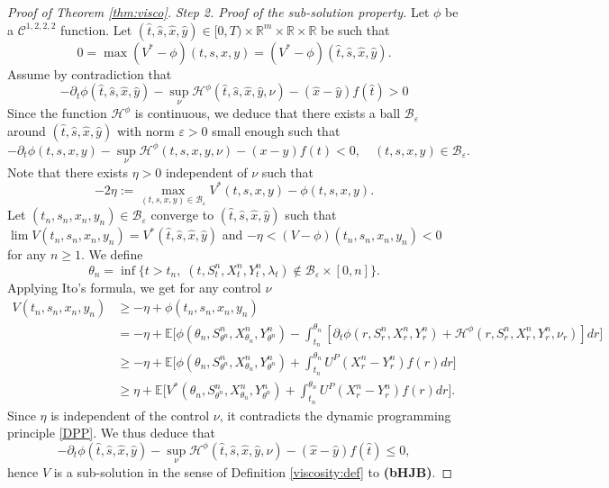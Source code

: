 \documentclass[11pt,a4paper]{article}
\theoremstyle{thmstyleone}%
\theoremstyle{thmstyletwo}%
\theoremstyle{thmstylethree}%
\begin{document}
\begin{proof}[Proof of Theorem \ref{thm:visco}]
        \textit{Step 2. Proof of the sub-solution property.} Let $\phi$ be a $\mathcal C^{1,2,2,2}$ function. Let $(\hat t,\hat s,\hat x,\hat y)\in [0,T)\times \mathbb R^m\times \mathbb R\times \mathbb R$ be such that 
    \[0=\max (V^*-\phi)(t,s,x,y)=(V^*-\phi)(\hat t,\hat s,\hat x,\hat y).\] Assume by contradiction that 
    \begin{equation*}\label{contradiction} -\partial_t \phi(\hat t,\hat s,\hat x,\hat y)-\sup_\nu \mathcal H^\phi(\hat t,\hat s,\hat x,\hat y,\nu)-(\hat x - \hat y) f(\hat t)>0\end{equation*}
    Since the function $\mathcal H^\phi$ is continuous, we deduce that there exists a ball $\mathcal B_\varepsilon$ around $(\hat t,\hat s,\hat x,\hat y)$ with norm $\varepsilon>0$ small enough such that 
    \[ -\partial_t \phi(t,s,x,y)- \sup_\nu \mathcal H^\phi(t,s,x,y,\nu)-(x-y) f(t)<0,\quad (t,s,x,y)\in \mathcal B_\varepsilon.\]
    Note that there exists $\eta>0$ independent of $\nu$ such that \[-2\eta:=\max_{(t,s,x,y)\in \mathcal B_\varepsilon}V^*(t,s,x,y)-\phi(t,s,x,y).\]
    Let $(t_n,s_n,x_n,y_n)\in \mathcal B_\varepsilon$ converge to $(\hat t,\hat s,\hat x,\hat y)$ such that $\lim\limits V(t_n,s_n,x_n,y_n)=V^*(\hat t,\hat s,\hat x,\hat y)$ and $-\eta<(V-\phi)(t_n,s_n,x_n,y_n)<0$ for any $n\geq 1$. We define 
    \[\theta_n=\inf\{t>t_n,\; (t,S^n_t,X^n_t,Y^n_t,\lambda_t)\notin \mathcal B_\varepsilon\times [0,n]\}.\]
Applying Ito's formula, we get for any control $\nu$
\begin{align*}
    V(t_n,s_n,x_n,y_n)&\geq -\eta+\phi(t_n,s_n,x_n,y_n)\\
    &=-\eta +\mathbb E\big[\phi(\theta_n,S_{\theta^n}^n,X_{\theta_n}^n,Y_{\theta^n}^n) -\int_{t_n}^{\theta_n}[\partial_t \phi(r,S_r^n,X_r^n,Y_r^n)+\mathcal H^{\phi}(r,S_r^n,X_r^n,Y_r^n,\nu_r)] dr\big]\\
    &\geq -\eta +\mathbb E\big[\phi(\theta_n,S_{\theta^n}^n,X_{\theta_n}^n,Y_{\theta^n}^n) +\int_{t_n}^{\theta_n}U^P(X_r^n-Y_r^n)f(r) dr\big]\\
    &\geq \eta+\mathbb E\big[V^*(\theta_n,S_{\theta^n}^n,X_{\theta_n}^n,Y_{\theta^n}^n) +\int_{t_n}^{\theta_n}U^P(X_r^n-Y_r^n)f(r) dr\big].
\end{align*}
 Since $\eta$ is independent of the control $\nu$, it contradicts the dynamic programming principle \eqref{DPP}. We thus deduce that 
 \[ -\partial_t \phi(\hat t,\hat s,\hat x,\hat y)-\sup_\nu \mathcal H^\phi(\hat t,\hat s,\hat x,\hat y,\nu)-(\hat x - \hat y) f(\hat t)\leq 0,\]
 hence $V$ is a sub-solution in the sense of Definition \ref{viscosity:def} to \textbf{(bHJB)}.
\end{proof}
\end{document}
